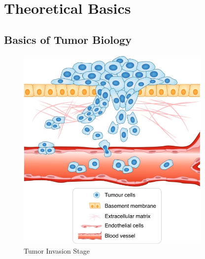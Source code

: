 \section{Theoretical Basics}
\label{sec:theoretical_basics}
\subsection{Basics of Tumor Biology}
\begin{figure}[h]
    \centering
    \includegraphics[width=0.85\textwidth]{resources/images/tumour_invasion_stage.png}
    \caption{Tumor Invasion Stage}
    \label{fig:tumor_invasion_stage}
\end{figure}

